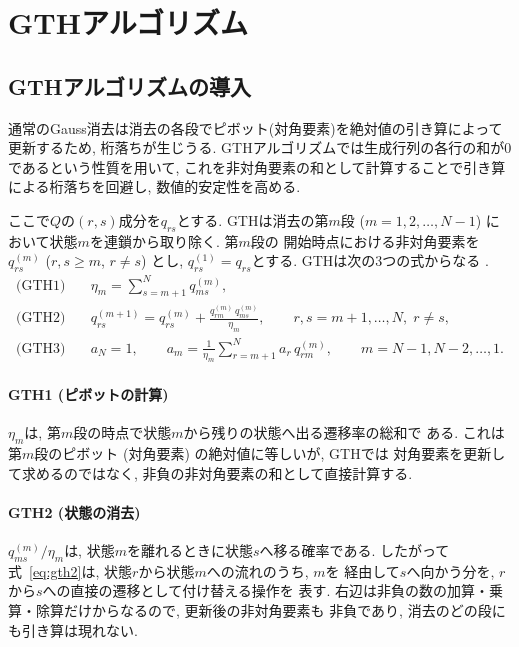 \documentclass[a4paper, 11pt, dvipdfmx]{jsreport}
\begin{document}
\section{GTHアルゴリズム}
\label{sec:gth}

\subsection{GTHアルゴリズムの導入}
\label{sec:gth-intro}
通常のGauss消去は消去の各段でピボット(対角要素)を絶対値の引き算によって更新するため, 桁落ちが生じうる. GTHアルゴリズムでは生成行列の各行の和が$0$であるという性質を用いて, 
これを非対角要素の和として計算することで引き算による桁落ちを回避し, 数値的安定性を高める. 
 
ここで$Q$の$(r, s)$成分を$q_{rs}$とする. GTHは消去の第$m$段
($m = 1, 2, \ldots, N-1$) において状態$m$を連鎖から取り除く. 第$m$段の
開始時点における非対角要素を$q^{(m)}_{rs}$ ($r, s \ge m$, $r \ne s$) とし, 
$q^{(1)}_{rs} = q_{rs}$とする. GTHは次の3つの式からなる
\cite{OCinneide1996}. 
\begin{align}
    \text{(GTH1)} \quad
        & \eta_m = \sum_{s=m+1}^{N} q^{(m)}_{ms}, 
        \label{eq:gth1} \\
    \text{(GTH2)} \quad
        & q^{(m+1)}_{rs} = q^{(m)}_{rs}
            + \frac{q^{(m)}_{rm}\, q^{(m)}_{ms}}{\eta_m}, 
        \qquad r, s = m+1, \ldots, N, \; r \ne s, 
        \label{eq:gth2} \\
    \text{(GTH3)} \quad
        & a_N = 1, \qquad
          a_m = \frac{1}{\eta_m} \sum_{r=m+1}^{N} a_r\, q^{(m)}_{rm}, 
          \qquad m = N-1, N-2, \ldots, 1. 
        \label{eq:gth3}
\end{align}
 
\paragraph{GTH1 (ピボットの計算)}
$\eta_m$は, 第$m$段の時点で状態$m$から残りの状態へ出る遷移率の総和で
ある. これは第$m$段のピボット (対角要素) の絶対値に等しいが, GTHでは
対角要素を更新して求めるのではなく, 非負の非対角要素の和として直接計算する. 
 
\paragraph{GTH2 (状態の消去)}
$q^{(m)}_{ms} / \eta_m$は, 状態$m$を離れるときに状態$s$へ移る確率である.
したがって式~\eqref{eq:gth2}は, 状態$r$から状態$m$への流れのうち, $m$を
経由して$s$へ向かう分を, $r$から$s$への直接の遷移として付け替える操作を
表す. 右辺は非負の数の加算・乗算・除算だけからなるので, 更新後の非対角要素も
非負であり, 消去のどの段にも引き算は現れない.
 
\end{document}
